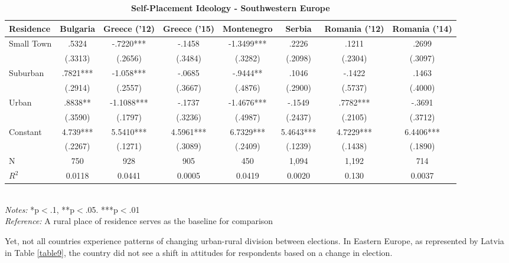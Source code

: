 \documentclass[12pt, titlepage]{article}
\newcommand\e{\emph}
\newcommand\tb{\textbf}
\begin{document}
\begin{landscape}
	\begin{table}
		\centering
		\def\arraystretch{1.5}
		\caption{\tb{Self-Placement Ideology - Southwestern Europe}}
		\begin{tabulary}{\linewidth}{l c c c c c c c}
			\\
			\hline
			\tb{Residence}& \tb{Bulgaria}& \tb{Greece ('12)}& \tb{Greece ('15)} & \tb{Montenegro} & \tb{Serbia} & \tb{Romania ('12)} & \tb {Romania ('14)}\\
			\hline
			Small Town&.5324 &-.7220*** &-.1458 & -1.3499*** & .2226 & .1211 & .2699\\
			&(.3313)& (.2656) & (.3484) & (.3282) & (.2098)& (.2304) & (.3097)\\
			Suburban& .7821*** & -1.058*** &-.0685 & -.9444** &.1046 &-.1422 &.1463\\
			& (.2914) &(.2557) & (.3667) & (.4876) &(.2900) & (.5737) & (.4000)\\
			Urban& .8838**& -1.1088*** & -.1737 & -1.4676*** & -.1549 & .7782*** & -.3691\\
			& (.3590)& (.1797) & (.3236) & (.4987) & (.2437) & (.2105) & (.3712)\\
			Constant& 4.739*** &5.5410*** & 4.5961*** &6.7329*** & 5.4643*** & 4.7229*** & 6.4406***\\
			& (.2267) & (.1271)  & (.3089) & (.2409) & (.1239) & (.1438) & (.1890)\\
			N& 750 & 928 & 905 & 450 & 1,094 & 1,192 &714\\
			$R^2$&0.0118 &0.0441& 0.0005 &0.0419 & 0.0020 & 0.130 &0.0037 \\
			\hline
		\end{tabulary}
		\\
		\e{Notes:} *p$<$.1, **p$<$.05. ***p$<$.01 \\
		\e{Reference:} A rural place of residence serves as the baseline for comparison
		\label{table8}
	\end{table}
\end{landscape}

Yet, not all countries experience patterns of changing urban-rural division between elections. In Eastern Europe, as represented by Latvia in Table \ref{table9}, the country did not see a shift in attitudes for respondents based on a change in election. 
\end{document}
